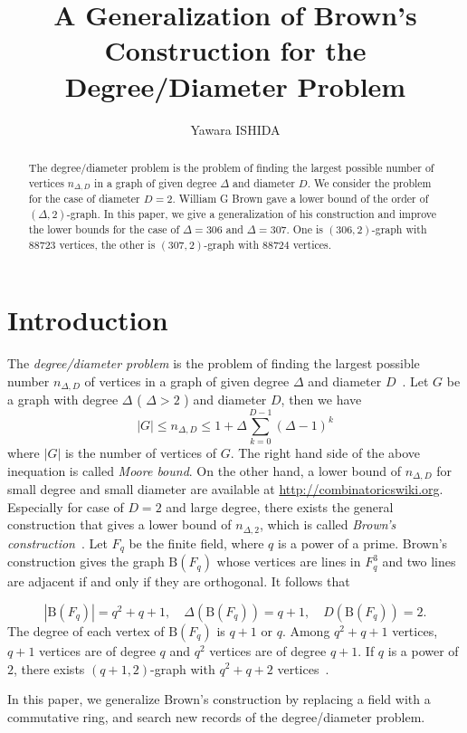 \documentclass{article}
\title{A Generalization of Brown's Construction for the Degree/Diameter Problem}
\author{Yawara ISHIDA}
\newcommand{\B}{\mathrm{B}}
\begin{document}
\maketitle
\begin{abstract}
The degree/diameter problem is the problem of finding the largest possible number of vertices $n_{\Delta,D}$ in a graph of given degree $\Delta$ and diameter $D$.
We consider the problem for the case of diameter $D=2$.
William G Brown gave a lower bound of the order of $(\Delta,2)$-graph.
In this paper, we give a generalization of his construction and improve the lower bounds for the case of $\Delta=306$ and $\Delta=307$.
One is $(306,2)$-graph with $88723$ vertices, the other is $(307,2)$-graph with $88724$ vertices.
\end{abstract}

\section{Introduction}

The {\it degree/diameter problem} is the problem of finding the largest possible number  $n_{\Delta,D}$ of vertices in a graph of given degree $\Delta$ and diameter $D$~\cite{MilSir2005}. 
Let $G$ be a graph with degree $\Delta$ ( $\Delta > 2$ ) and diameter $D$, then we have 
\[ |G| \leq n_{\Delta,D} \leq 1 + \Delta \sum_{k=0}^{D-1} (\Delta - 1)^k\]
where $|G|$ is the number of vertices of $G$. 
The right hand side of the above inequation is called {\it Moore bound}.
On the other hand, a lower bound of $n_{\Delta,D}$ for small degree and small diameter are available at \url{http://combinatoricswiki.org}. 
Especially for case of $D=2$ and large degree, there exists the general construction that gives a lower bound of $n_{\Delta,2}$, which is called {\it Brown's construction}~\cite{MilSir2005}.
Let $F_q$ be the finite field, where $q$ is a power of a prime.
Brown's construction gives the graph $\B(F_q)$ whose vertices are lines in $F_q^3$ and two lines are adjacent if and only if they are orthogonal. 
It follows that

\[|\B(F_q)| = q^2+q+1, \quad
\Delta(\B(F_q)) = q+1, \quad
D(\B(F_q))=2.
\]
The degree of each vertex of $\B(F_q)$ is $q+1$ or $q$. 
Among $q^2+q+1$ vertices, $q+1$ vertices are of degree $q$ and $q^2$ vertices are of degree $q+1$.
If $q$ is a power of $2$, there exists $(q+1,2)$-graph with $q^2+q+2$ vertices~\cite{journals/networks/ErdosFH80}.

In this paper, we generalize Brown's construction by replacing a field with a commutative ring, and search new records of the degree/diameter problem.
\end{document}
